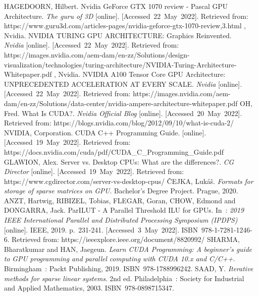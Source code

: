 \begin{thebibliography}{42}
	HAGEDOORN, Hilbert. Nvidia GeForce GTX 1070 review - Pascal GPU Architecture. \textit{The guru of 3D} [online]. [Accessed 22 May 2022]. Retrieved from: https://www.guru3d.com/articles-pages/nvidia-geforce-gtx-1070-review,3.html
	, Nvidia. NVIDIA TURING GPU ARCHITECTURE: Graphics Reinvented. \textit{Nvidia} [online]. [Accessed 22 May 2022]. Retrieved from: https://images.nvidia.com/aem-dam/en-zz/Solutions/design-visualization/technologies/turing-architecture/NVIDIA-Turing-Architecture-Whitepaper.pdf
	, Nvidia. NVIDIA A100 Tensor Core GPU Architecture: UNPRECEDENTED ACCELERATION AT EVERY SCALE. \textit{Nvidia} [online]. [Accessed 22 May 2022]. Retrieved from: https://images.nvidia.com/aem-dam/en-zz/Solutions/data-center/nvidia-ampere-architecture-whitepaper.pdf
	OH, Fred. What Is CUDA?. \textit{Nvidia Official Blog} [online]. [Accessed 20 May 2022]. Retrieved from: https://blogs.nvidia.com/blog/2012/09/10/what-is-cuda-2/
	NVIDIA, Corporation. CUDA C++ Programming Guide. [online]. [Accessed 19 May 2022]. Retrieved from: https://docs.nvidia.com/cuda/pdf/CUDA\_C\_Programming\_Guide.pdf
	GLAWION, Alex. Server vs. Desktop CPUs: What are the differences?. \textit{CG Director} [online]. [Accessed 19 May 2022]. Retrieved from: https://www.cgdirector.com/server-vs-desktop-cpus/
	ČEJKA, Lukáš. \textit{Formats for storage of sparse matrices on GPU}. Bachelor's Degree Project. Prague, 2020.
	ANZT, Hartwig, RIBIZEL, Tobias, FLEGAR, Goran, CHOW, Edmond and DONGARRA, Jack. ParILUT - A Parallel Threshold ILU for GPUs. In : \textit{2019 IEEE International Parallel and Distributed Processing Symposium (IPDPS)} [online]. IEEE, 2019. p. 231-241. [Accessed 3 May 2022]. ISBN 978-1-7281-1246-6. Retrieved from: https://ieeexplore.ieee.org/document/8820992/
	SHARMA, Bharatkumar and HAN, Jaegeun. \textit{Learn CUDA Programming: A beginner's guide to GPU programming and parallel computing with CUDA 10.x and C/C++}. Birmingham : Packt Publishing, 2019. ISBN 978-1788996242.
	SAAD, Y. \textit{Iterative methods for sparse linear systems}. 2nd ed. Philadelphia : Society for Industrial and Applied Mathematics, 2003. ISBN 978-0898715347.
	
\end{thebibliography}